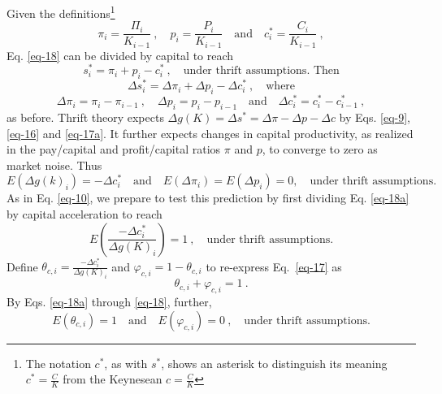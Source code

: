 \documentclass[a4paper,fleqn]{latex_styles/cas-sc}
\begin{document}
%
Given the definitions\footnote{The notation \(c^*\), as with \(s^*\), shows an asterisk to distinguish its meaning \(c^* = \frac{C}{K}\) from the Keynesean \(c = \frac{C}{K}\)}
%
\begin{equation*}
\pi_i = \frac{\Pi_i}{K_{i - 1}} \ , \quad p_i = \frac{P_i}{K_{i-1}} \quad \text{and} \quad c^*_i = \frac{C_i}{K_{i-1}}\ ,
\end{equation*}
%
Eq. \eqref{eq-18} can be divided by capital to reach
%
\begin{equation}
    s^*_i = \pi_i + p_i - c^*_i\ ,\quad \text{under thrift assumptions. Then}\label{eq-16}
\end{equation}
\vspace{-5ex}
\begin{equation}
    \Delta s^*_i = \Delta \pi_i + \Delta p_i - \Delta c^*_i\ ,\quad \text{where}\label{eq-17a}
\end{equation}
\begin{equation*}
    \Delta \pi_i = \pi_i - \pi_{i - 1} \ , \quad \Delta p_i = p_i - p_{i - 1} \quad \text{and} \quad \Delta c^*_i = c^*_i - c^*_{i - 1}\ ,
\end{equation*}
%
as before. Thrift theory expects \(\Delta g(K) = \Delta s^* = \Delta \pi - \Delta p - \Delta c\) by Eqs. \eqref{eq-9}, \eqref{eq-16} and \eqref{eq-17a}.
    It further expects changes in capital productivity, as realized in the pay/capital and profit/capital ratios \(\pi\) and \(p\), to converge to zero as market noise. Thus
%
\begin{equation}
    E(\Delta g(k)_i) = - \Delta c^*_i \quad \text{and} \quad E(\Delta \pi_i) = E(\Delta p_i) = 0, \quad \text{under thrift assumptions.}\label{eq-18a}
\end{equation}
%
As in Eq. \eqref{eq-10}, we prepare to test this prediction by first dividing Eq. \eqref{eq-18a} by capital acceleration to reach
% 
\begin{equation}
    E(\frac{- \Delta c^{*}_{i}}{ \Delta g(K)_{i}}) = 1\ ,\quad \text{under thrift assumptions.}\label{eq-17}
\end{equation}
%
Define \(\theta_{c,i} = \frac{- \Delta c^{*}_{i}}{ \Delta g(K)_{i}}\)
and \(\varphi_{c,i} = 1 - \theta_{c,i}\) to
re-express Eq.~\eqref{eq-17} as
%
\begin{equation}
\theta_{c,i} + \varphi_{c,i} = 1\ .\label{eq-18}
\end{equation}
%
By Eqs. \eqref{eq-18a} through \eqref{eq-18}, further,
%
\begin{equation}
    E\left( \theta_{c,i} \right) = 1 \quad \text{and} \quad E\left( \varphi_{c,i} \right) = 0 \ , \quad \text{under thrift assumptions.}\label{eq-19}
\end{equation}
\end{document}

